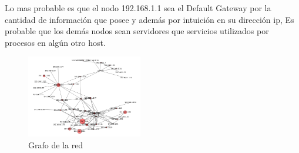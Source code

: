 Lo mas probable es que el nodo 192.168.1.1 sea el Default Gateway por la cantidad de información que posee
y además por intuición en su dirección ip, 
Es probable que los demás nodos sean servidores que servicios utilizados por procesos en algún otro host.

\begin{figure}[h]
  \centering
    \includegraphics[width=0.45\textwidth]{grafico3-red-taringa.png}
  \caption{Grafo de la red}
  \label{}
\end{figure}
